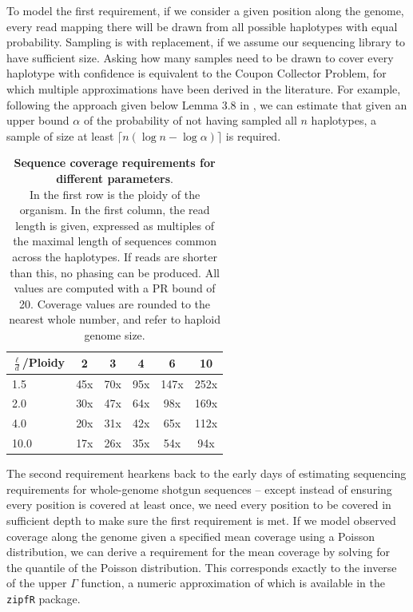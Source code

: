 To model the first requirement, if we consider a given position along the genome, every read mapping there will be drawn from all possible haplotypes with equal probability.
Sampling is with replacement, if we assume our sequencing library to have sufficient size.
Asking how many samples need to be drawn to cover every haplotype with confidence is equivalent to the Coupon Collector Problem, for which multiple approximations have been derived in the literature. %
For example, following the approach given below Lemma 3.8 in \cite{mitzenmacher17}, we can estimate that given an upper bound $\alpha$ of the probability of not having sampled all $n$ haplotypes, a sample of size at least $\lceil n(\log n - \log \alpha) \rceil$ is required.


\begin{table}[t]
\centering
\caption{
\textbf{Sequence coverage requirements for different parameters}.\\
In the first row is the ploidy of the organism.
In the first column, the read length is given, expressed as multiples of the maximal length of sequences common across the haplotypes.
If reads are shorter than this, no phasing can be produced.
All values are computed with a PR bound of 20.
Coverage values are rounded to the nearest whole number, and refer to haploid genome size.
}
\label{table:covcalc}
\vspace{1em}
\begin{tabular}{l|ccccc}
	{\bf $\frac{\ell}{d}$/Ploidy}& 2 & 3 & 4 & 6 & 10\\
	\hline
	1.5 & 45x & 70x & 95x & 147x & 252x \\
	2.0 & 30x & 47x & 64x & 98x & 169x\\
	4.0 & 20x & 31x & 42x & 65x & 112x\\ 
	10.0 & 17x & 26x & 35x & 54x & 94x
\end{tabular}
\end{table}

The second requirement hearkens back to the early days of estimating sequencing requirements for whole-genome shotgun sequences -- except instead of ensuring every position is covered at least once, we need every position to be covered in sufficient depth to make sure the first requirement is met.
If we model observed coverage along the genome given a specified mean coverage using a Poisson distribution, we can derive a requirement for the mean coverage by solving for the quantile of the Poisson distribution.
This corresponds exactly to the inverse of the upper $\Gamma$ function, a numeric approximation of which is available in the \texttt{zipfR} package.


